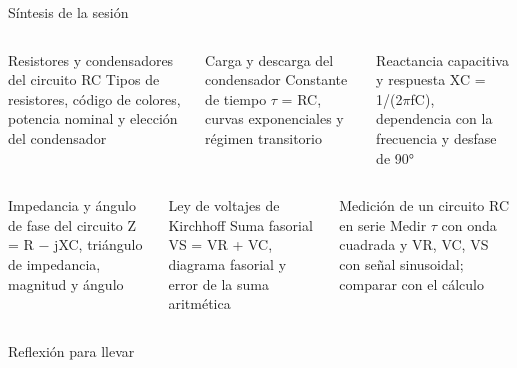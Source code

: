 \documentclass[aspectratio=169,11pt,xcolor={table}]{beamer}
\begin{document}
\begin{frame}{Síntesis de la sesión}
\begin{columns}[T,onlytextwidth]
\begin{cardB}{Resistores y condensadores del circuito RC}
\scriptsize Tipos de resistores, código de colores, potencia nominal y elección del condensador
\end{cardB}
\begin{cardO}{Carga y descarga del condensador}
\scriptsize Constante de tiempo \ensuremath{\tau} = RC, curvas exponenciales y régimen transitorio
\end{cardO}
\begin{cardG}{Reactancia capacitiva y respuesta}
\scriptsize XC = 1/(2\ensuremath{\pi}fC), dependencia con la frecuencia y desfase de 90°
\end{cardG}
\end{columns}
\vspace{2mm}
\begin{columns}[T,onlytextwidth]
\begin{cardB}{Impedancia y ángulo de fase del circuito}
\scriptsize Z = R \ensuremath{-} jXC, triángulo de impedancia, magnitud y ángulo
\end{cardB}
\begin{cardO}{Ley de voltajes de Kirchhoff}
\scriptsize Suma fasorial VS = VR + VC, diagrama fasorial y error de la suma aritmética
\end{cardO}
\begin{cardG}{Medición de un circuito RC en serie}
\scriptsize Medir \ensuremath{\tau} con onda cuadrada y VR, VC, VS con señal sinusoidal; comparar con el cálculo
\end{cardG}
\end{columns}
\end{frame}

\begin{frame}{Reflexión para llevar}
\centering
{}
\end{frame}
\end{document}

